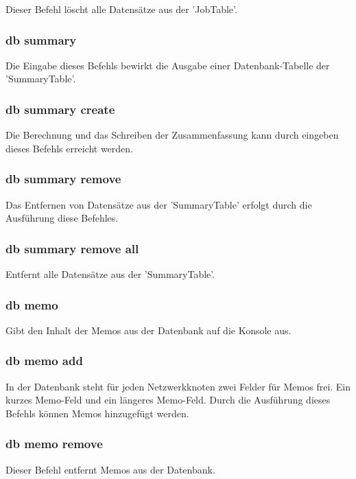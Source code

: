 \documentclass[12pt,a4paper]{report}
\begin{document}
\begin{onehalfspace}
Dieser Befehl löscht alle Datensätze aus der 'JobTable'.

\subsubsection{db summary}

Die Eingabe dieses Befehls bewirkt die Ausgabe einer Datenbank-Tabelle der 'SummaryTable'.

\subsubsection{db summary create}

Die Berechnung und das Schreiben der Zusammenfassung kann durch eingeben dieses Befehls erreicht werden.

\subsubsection{db summary remove}

Das Entfernen von Datensätze aus der 'SummaryTable' erfolgt durch die Ausführung diese Befehles.

\subsubsection{db summary remove all}

Entfernt alle Datensätze aus der 'SummaryTable'.

\subsubsection{db memo}

Gibt den Inhalt der Memos aus der Datenbank auf die Konsole aus.

\subsubsection{db memo add}

In der Datenbank steht für jeden Netzwerkknoten zwei Felder für Memos frei. Ein kurzes Memo-Feld und ein längeres Memo-Feld. Durch die Ausführung dieses Befehls können Memos hinzugefügt werden.

\subsubsection{db memo remove}

Dieser Befehl entfernt Memos aus der Datenbank.


\end{onehalfspace}
\end{document}
